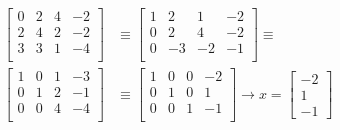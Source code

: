 \documentclass{article}
\newcommand{\1}{\mathbf{1}}
\begin{document}
\begin{enumerate}
\begin{align*}
	    \left[\begin{array}{ccc|c} 
	    0 & 2 & 4 & -2 \\ 2 & 4 & 2 & -2 \\ 3 & 3 & 1 & -4 \\
	    \end{array} \right] &\equiv 
	    \left[\begin{array}{ccc|c} 
	    1 & 2 & 1 & -2 \\ 0 & 2 & 4 & -2 \\ 0 & -3 & -2 & -1 \\
	    \end{array} \right] \equiv \\
	    \left[\begin{array}{ccc|c} 
	    1 & 0 & 1 & -3 \\ 0 & 1 & 2 & -1 \\ 0 & 0 & 4 & -4 \\
	    \end{array} \right] &\equiv
	    \left[\begin{array}{ccc|c} 
	    1 & 0 & 0 & -2 \\ 0 & 1 & 0 & 1 \\ 0 & 0 & 1 & -1 \\
	    \end{array} \right] 
	    \rightarrow x = \begin{bmatrix} -2 \\ 1 \\ -1 \end{bmatrix}
	\end{align*}
\end{enumerate}
\end{document}
